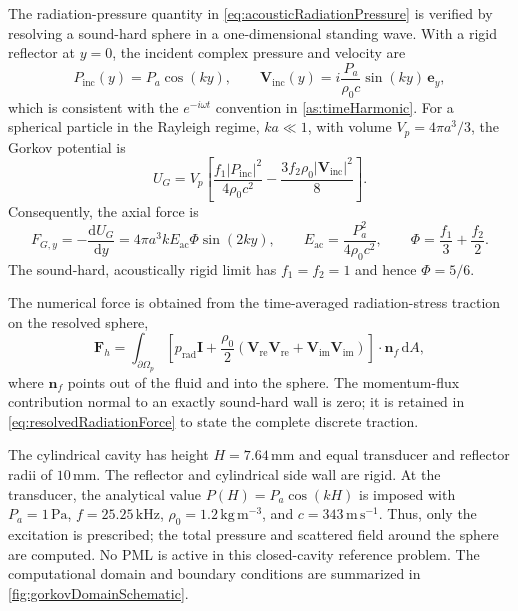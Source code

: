 \documentclass[final,12pt,nopreprintline,longtitle]{elsarticle}
\newcommand{\V}{\mathbf{V}}
\begin{document}
The radiation-pressure quantity in \cref{eq:acousticRadiationPressure} is
verified by resolving a sound-hard sphere in a one-dimensional standing wave.
With a rigid reflector at $y=0$, the incident complex pressure and velocity are
\begin{equation}
    P_{\mathrm{inc}}(y)=P_a\cos(ky),
    \qquad
    \V_{\mathrm{inc}}(y)=
    i\frac{P_a}{\rho_0c}\sin(ky)\,\mathbf e_y,
    \label{eq:gorkovStandingWave}
\end{equation}
which is consistent with the $e^{-i\omega t}$ convention in
\cref{as:timeHarmonic}.  For a spherical particle in the Rayleigh regime,
$ka\ll1$, with volume $V_p=4\pi a^3/3$, the Gorkov potential is
\cite{gorkov1962potential}
\begin{equation}
    U_G=V_p\left[
        \frac{f_1|P_{\mathrm{inc}}|^2}{4\rho_0c^2}
        -\frac{3f_2\rho_0|\V_{\mathrm{inc}}|^2}{8}
    \right].
    \label{eq:gorkovPotential}
\end{equation}
Consequently, the axial force is
\begin{equation}
    F_{G,y}=-\frac{\mathrm dU_G}{\mathrm dy}
    =4\pi a^3kE_{\mathrm{ac}}\Phi\sin(2ky),
    \qquad
    E_{\mathrm{ac}}=\frac{P_a^2}{4\rho_0c^2},
    \qquad
    \Phi=\frac{f_1}{3}+\frac{f_2}{2}.
    \label{eq:gorkovForce}
\end{equation}
The sound-hard, acoustically rigid limit has $f_1=f_2=1$ and hence
$\Phi=5/6$.

The numerical force is obtained from the time-averaged radiation-stress
traction on the resolved sphere,
\begin{equation}
    \mathbf F_h=
    \int_{\partial\Omega_p}
    \left[
        p_{\mathrm{rad}}\mathbf I
        +\frac{\rho_0}{2}
        \left(
            \V_{\mathrm{re}}\V_{\mathrm{re}}
            +\V_{\mathrm{im}}\V_{\mathrm{im}}
        \right)
    \right]\cdot\mathbf n_f\,\mathrm dA,
    \label{eq:resolvedRadiationForce}
\end{equation}
where $\mathbf n_f$ points out of the fluid and into the sphere.  The
momentum-flux contribution normal to an exactly sound-hard wall is zero; it is
retained in \cref{eq:resolvedRadiationForce} to state the complete discrete
traction.

The cylindrical cavity has height $H=7.64\,\mathrm{mm}$ and equal transducer
and reflector radii of $10\,\mathrm{mm}$.  The reflector and cylindrical side
wall are rigid.  At the transducer, the analytical value
$P(H)=P_a\cos(kH)$ is imposed with $P_a=1\,\mathrm{Pa}$,
$f=25.25\,\mathrm{kHz}$, $\rho_0=1.2\,\mathrm{kg\,m^{-3}}$, and
$c=343\,\mathrm{m\,s^{-1}}$.  Thus, only the excitation is prescribed; the
total pressure and scattered field around the sphere are computed.  No PML is
active in this closed-cavity reference problem.  The computational domain and
boundary conditions are summarized in \cref{fig:gorkovDomainSchematic}.
\end{document}
